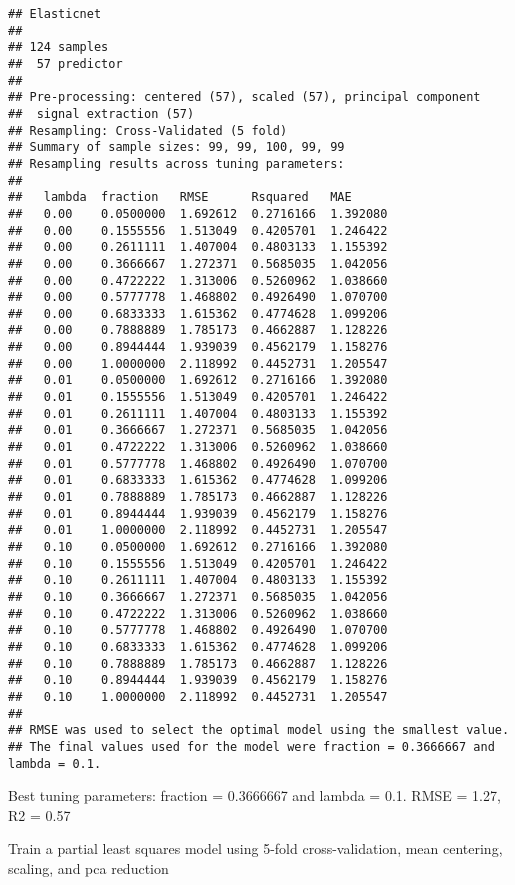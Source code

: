 \documentclass[
]{article}
\begin{document}
\begin{verbatim}
## Elasticnet 
## 
## 124 samples
##  57 predictor
## 
## Pre-processing: centered (57), scaled (57), principal component
##  signal extraction (57) 
## Resampling: Cross-Validated (5 fold) 
## Summary of sample sizes: 99, 99, 100, 99, 99 
## Resampling results across tuning parameters:
## 
##   lambda  fraction   RMSE      Rsquared   MAE     
##   0.00    0.0500000  1.692612  0.2716166  1.392080
##   0.00    0.1555556  1.513049  0.4205701  1.246422
##   0.00    0.2611111  1.407004  0.4803133  1.155392
##   0.00    0.3666667  1.272371  0.5685035  1.042056
##   0.00    0.4722222  1.313006  0.5260962  1.038660
##   0.00    0.5777778  1.468802  0.4926490  1.070700
##   0.00    0.6833333  1.615362  0.4774628  1.099206
##   0.00    0.7888889  1.785173  0.4662887  1.128226
##   0.00    0.8944444  1.939039  0.4562179  1.158276
##   0.00    1.0000000  2.118992  0.4452731  1.205547
##   0.01    0.0500000  1.692612  0.2716166  1.392080
##   0.01    0.1555556  1.513049  0.4205701  1.246422
##   0.01    0.2611111  1.407004  0.4803133  1.155392
##   0.01    0.3666667  1.272371  0.5685035  1.042056
##   0.01    0.4722222  1.313006  0.5260962  1.038660
##   0.01    0.5777778  1.468802  0.4926490  1.070700
##   0.01    0.6833333  1.615362  0.4774628  1.099206
##   0.01    0.7888889  1.785173  0.4662887  1.128226
##   0.01    0.8944444  1.939039  0.4562179  1.158276
##   0.01    1.0000000  2.118992  0.4452731  1.205547
##   0.10    0.0500000  1.692612  0.2716166  1.392080
##   0.10    0.1555556  1.513049  0.4205701  1.246422
##   0.10    0.2611111  1.407004  0.4803133  1.155392
##   0.10    0.3666667  1.272371  0.5685035  1.042056
##   0.10    0.4722222  1.313006  0.5260962  1.038660
##   0.10    0.5777778  1.468802  0.4926490  1.070700
##   0.10    0.6833333  1.615362  0.4774628  1.099206
##   0.10    0.7888889  1.785173  0.4662887  1.128226
##   0.10    0.8944444  1.939039  0.4562179  1.158276
##   0.10    1.0000000  2.118992  0.4452731  1.205547
## 
## RMSE was used to select the optimal model using the smallest value.
## The final values used for the model were fraction = 0.3666667 and lambda = 0.1.
\end{verbatim}

Best tuning parameters: fraction = 0.3666667 and lambda = 0.1. RMSE =
1.27, R2 = 0.57

Train a partial least squares model using 5-fold cross-validation, mean
centering, scaling, and pca reduction
\end{document}
